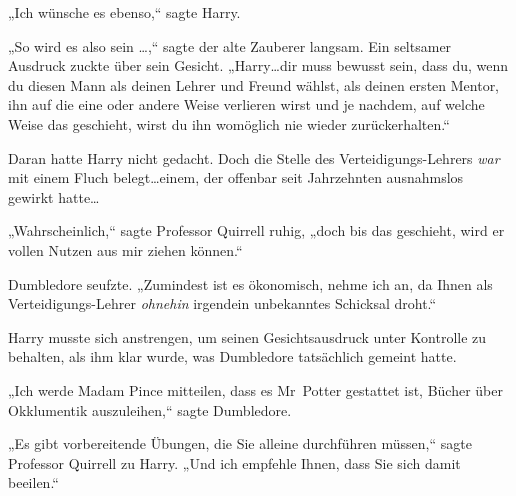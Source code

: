 „Ich wünsche es ebenso,“ sagte Harry.

„So wird es also sein …,“ sagte der alte Zauberer langsam. Ein seltsamer Ausdruck zuckte über sein Gesicht. „Harry…dir muss bewusst sein, dass du, wenn du diesen Mann als deinen Lehrer und Freund wählst, als deinen ersten Mentor, ihn auf die eine oder andere Weise verlieren wirst und je nachdem, auf welche Weise das geschieht, wirst du ihn womöglich nie wieder zurückerhalten.“

Daran hatte Harry nicht gedacht. Doch die Stelle des Verteidigungs-Lehrers \emph{war} mit einem Fluch belegt…einem, der offenbar seit Jahrzehnten ausnahmslos gewirkt hatte…

„Wahrscheinlich,“ sagte Professor Quirrell ruhig, „doch bis das geschieht, wird er vollen Nutzen aus mir ziehen können.“

Dumbledore seufzte. „Zumindest ist es ökonomisch, nehme ich an, da Ihnen als Verteidigungs-Lehrer \emph{ohnehin} irgendein unbekanntes Schicksal droht.“

Harry musste sich anstrengen, um seinen Gesichtsausdruck unter Kontrolle zu behalten, als ihm klar wurde, was Dumbledore tatsächlich gemeint hatte.

„Ich werde Madam Pince mitteilen, dass es Mr~Potter gestattet ist, Bücher über Okklumentik auszuleihen,“ sagte Dumbledore.

„Es gibt vorbereitende Übungen, die Sie alleine durchführen müssen,“ sagte Professor Quirrell zu Harry. „Und ich empfehle Ihnen, dass Sie sich damit beeilen.“

